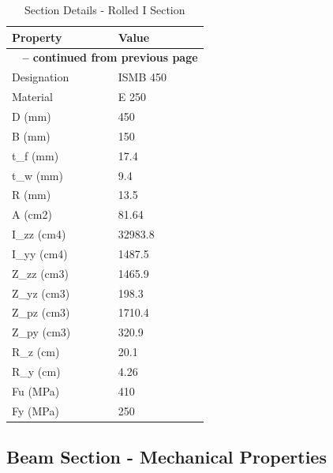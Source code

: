 \documentclass[12pt]{article}
\begin{document}
\begin{longtable}{ll}
\caption{Section Details - Rolled I Section}
\label{tab:section-details}
\cellcolor{OsdagGreen} Property & \cellcolor{OsdagGreen} Value \\ \hline
\endfirsthead
\multicolumn{2}{c}{{\bfseries \tablename\ \thetable{} -- continued from previous page}} \\
\endhead
\endfoot
\endlastfoot
Designation & ISMB 450 \\
\hline
Material & E 250 \\
\hline
D (mm) & 450 \\
\hline
B (mm) & 150 \\
\hline
t\_f (mm) & 17.4 \\
\hline
t\_w (mm) & 9.4 \\
\hline
R (mm) & 13.5 \\
\hline
A (cm2) & 81.64 \\
\hline
I\_zz (cm4) & 32983.8 \\
\hline
I\_yy (cm4) & 1487.5 \\
\hline
Z\_zz (cm3) & 1465.9 \\
\hline
Z\_yz (cm3) & 198.3 \\
\hline
Z\_pz (cm3) & 1710.4 \\
\hline
Z\_py (cm3) & 320.9 \\
\hline
R\_z (cm) & 20.1 \\
\hline
R\_y (cm) & 4.26 \\
\hline
Fu (MPa) & 410 \\
\hline
Fy (MPa) & 250 \\
\hline
\end{longtable}

\subsection{Beam Section - Mechanical Properties}
\end{document}
